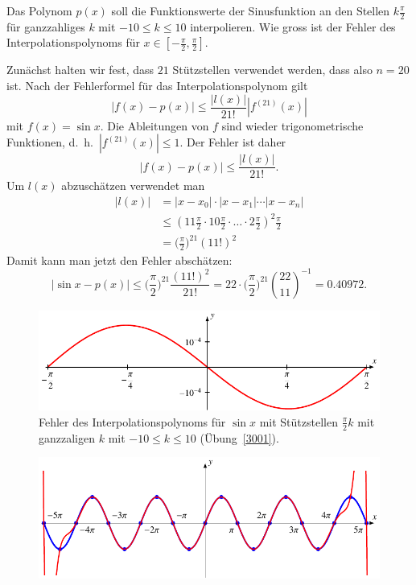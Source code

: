 Das Polynom $p(x)$ soll die Funktionswerte der Sinusfunktion an den
Stellen $k\frac{\pi}2$ für ganzzahliges $k$ mit $-10\le k\le 10$
interpolieren.
Wie gross ist der Fehler des Interpolationspolynoms für
$x\in [-\frac{\pi}2,\frac{\pi}2]$.

\begin{loesung}
Zunächst halten wir fest, dass $21$ Stützstellen verwendet werden, dass
also $n=20$ ist.
Nach der Fehlerformel für das Interpolationspolynom gilt
\[
|f(x)-p(x)| \le \frac{|l(x)|}{21!} |f^{(21)}(x)|
\]
mit $f(x)=\sin x$.
Die Ableitungen von $f$ sind wieder trigonometrische Funktionen,
d.~h.~$|f^{(21)}(x)|\le 1$.
Der Fehler ist daher
\[
|f(x)-p(x)| \le \frac{|l(x)|}{21!}.
\]
Um $l(x)$ abzuschätzen verwendet man
\begin{align*}
|l(x)|
&=
|x-x_0|\cdot|x-x_1|\cdots |x-x_n|
\\
&\le
(11\frac{\pi}2\cdot 10\frac{\pi}2\cdot\dots\cdot 2\frac{\pi}2)^2 \frac{\pi}2
\\
&=
\biggl(\frac{\pi}2\biggr)^{21}
(11!)^2
\end{align*}
Damit kann man jetzt den Fehler abschätzen:
\[
|\sin x-p(x)|
\le 
\biggl(\frac{\pi}2\biggr)^{21}
\frac{(11!)^2}{21!}
=
22\cdot 
\biggl(\frac{\pi}2\biggr)^{21}
\binom{22}{11}^{-1}
=
0.40972.
\]
\begin{figure}
\centering
\includegraphics{chapters/30-interpolation/uebungsaufgaben/3001fehler.pdf}
\caption{Fehler des Interpolationspolynoms für $\sin x$ mit Stützstellen
$\frac{\pi}2k$ mit ganzzaligen $k$ mit $-10\le k\le 10$
(Übung~\ref{3001}).
\label{buch:uebungsaufgaben:figure:3001}}
\end{figure}%
\begin{figure}
\centering
\includegraphics{chapters/30-interpolation/uebungsaufgaben/3001plot.pdf}

\end{figure}
\end{loesung}
